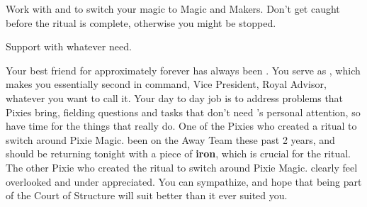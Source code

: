 \documentclass[char]{PP}
\begin{document}
\begin{itemz}
	\item Work with \cMChange{} and \cFWanabe{} to switch your magic to Magic and Makers. Don't get caught before the ritual is complete, otherwise you might be stopped.
	\item Support \cSHead{} with whatever \cSHead{\they} need\cSHead{\plural}.
\end{itemz}

\begin{itemz}[Notes]
	\item 
\end{itemz}

\begin{contacts}
	\contact{\cSHead{}} Your best friend for approximately forever has always been \cSHead{}. You serve as \cSHead{\Their} \cSAdvisor{\heir}, which makes you essentially \cSHead{\their} second in command, Vice President, Royal Advisor, whatever you want to call it. Your day to day job is to address problems that Pixies bring, fielding questions and tasks that don't need \cSHead{}'s personal attention, so \cSHead{\they} have time for the things that really do.
	\contact{\cMChange{}}  One of the Pixies who created a ritual to switch around Pixie Magic. \cMChange{\They} \cMChange{\have} been on the Away Team these past 2 years, and should be returning tonight with a piece of \textbf{iron}, which is crucial for the ritual.
	\contact{\cFWanabe{}} The other Pixie who created the ritual to switch around Pixie Magic. \cFWanabe{\They} clearly feel\cFWanabe{\plural} overlooked and under appreciated. You can sympathize, and hope that being part of the Court of Structure will suit \cFWanabe{} better than it ever suited you.
\end{contacts}
\end{document}

